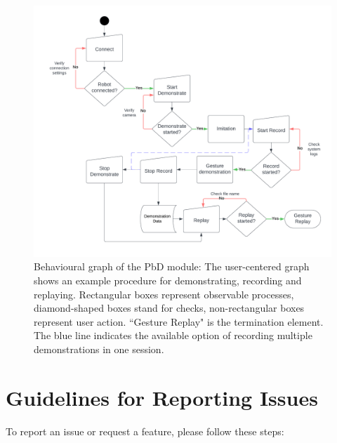 \documentclass{CSSRforAfrica}
\begin{document}
\begin{figure}[H]
    \centering
    \includegraphics[width=\linewidth]{figures/BehaviouralGraph.png}
    \caption{Behavioural graph of the PbD module: The user-centered graph shows an example procedure for demonstrating, recording and replaying. Rectangular boxes represent observable processes, diamond-shaped boxes stand for checks, non-rectangular boxes represent user action. ``Gesture Replay" is the termination element. The blue line indicates the available option of recording multiple demonstrations in one session.}
    \label{fig:behavioural}
\end{figure}

\newpage

\section{Guidelines for Reporting Issues} \label{sec:report}
To report an issue or request a feature, please follow these steps:
\end{document}
